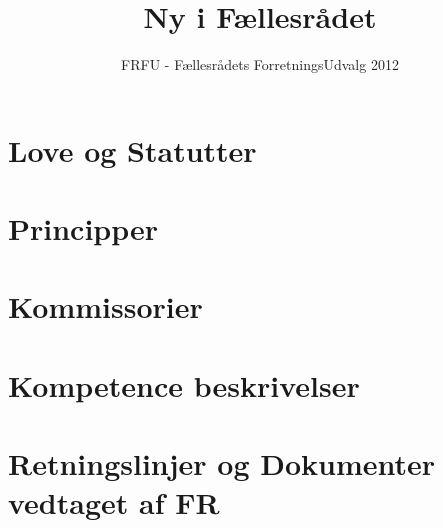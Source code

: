 \documentclass[a4paper,danish]{article}
\title{Ny i Fællesrådet}
\author{FRFU - Fællesrådets ForretningsUdvalg 2012}
\begin{document}
\maketitle

\newpage
\tableofcontents
\newpage

\newpage

\part{Love og Statutter}



\newpage


\part{Principper}
\setcounter{section}{0}








\newpage

\part{Kommissorier}
\setcounter{section}{0}






\part{Kompetence beskrivelser}
\setcounter{section}{0}



\part{Retningslinjer og Dokumenter vedtaget af FR}
\setcounter{section}{0}


%

\end{document}
